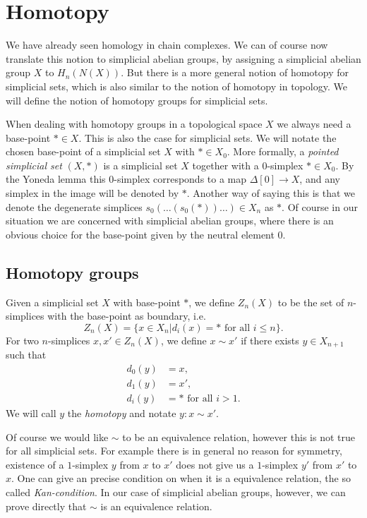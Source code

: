 \section{Homotopy}
\label{sec:Homotopy}

We have already seen homology in chain complexes. We can of course now translate this notion to simplicial abelian groups, by assigning a simplicial abelian group $X$ to $H_n(N(X))$. But there is a more general notion of homotopy for simplicial sets, which is also similar to the notion of homotopy in topology. We will define the notion of homotopy groups for simplicial sets.

When dealing with homotopy groups in a topological space $X$ we always need a base-point $\ast \in X$. This is also the case for simplicial sets. We will notate the chosen base-point of a simplicial set $X$ with $\ast \in X_0$. More formally, a \emph{pointed simplicial set} $(X, \ast)$ is a simplicial set $X$ together with a $0$-simplex $\ast \in X_0$. By the Yoneda lemma this $0$-simplex corresponds to a map $\Delta[0] \to X$, and any simplex in the image will be denoted by $\ast$. Another way of saying this is that we denote the degenerate simplices $s_0(\ldots(s_0(\ast))\ldots) \in X_n$ as $\ast$. Of course in our situation we are concerned with simplicial abelian groups, where there is an obvious choice for the base-point given by the neutral element $0$.

\subsection{Homotopy groups}
\begin{definition}
	Given a simplicial set $X$ with base-point $\ast$, we define $Z_n(X)$ to be the set of $n$-simplices with the base-point as boundary, i.e.
	$$ Z_n(X) = \{ x \in X_n | d_i(x) = \ast \text{ for all } i \leq n \}. $$
	For two $n$-simplices $x, x' \in Z_n(X)$, we define $x \sim x'$ if there exists $y \in X_{n+1}$ such that
	\begin{align}
		d_0(y) &= x, \\
		d_1(y) &= x', \\
		d_i(y) &= \ast \text{ for all } i > 1.
	\end{align}
	We will call $y$ the \emph{homotopy} and notate $y: x \sim x'$.
\end{definition}

Of course we would like $\sim$ to be an equivalence relation, however this is not true for all simplicial sets. For example there is in general no reason for symmetry, existence of a $1$-simplex $y$ from $x$ to $x'$ does not give us a $1$-simplex $y'$ from $x'$ to $x$. One can give an precise condition on when it is a equivalence relation, the so called \emph{Kan-condition}. In our case of simplicial abelian groups, however, we can prove directly that $\sim$ is an equivalence relation.

